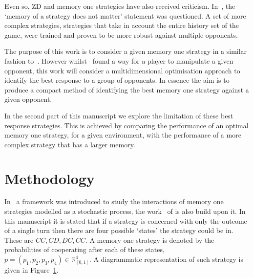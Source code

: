 \documentclass[10pt]{article}
\newcommand{\R}{\mathbb{R}}
\begin{document}
Even so, ZD and memory one strategies have also received criticism. In~\cite{Harper2015},
the `memory of a strategy does not matter' statement was questioned. A set of more
complex strategies, strategies that take in account the entire history set of the
game, were trained and proven to be more robust against multiple opponents.

The purpose of this work is to consider a given memory one strategy 
in a similar fashion to~\cite{Press2012}. However whilst~\cite{Press2012} found
a way for a player to manipulate a given opponent, this work will consider a multidimensional
optimisation approach to identify the best response to a group of opponents. In
essence the aim is to produce a compact method of identifying the best memory one
strategy against a given opponent.

In the second part of this manuscript we explore the limitation of these best response
strategies. This is achieved by comparing the performance of an optimal
memory one strategy, for a given environment, with the performance of a more complex
strategy that has a larger memory.

\section{Methodology}

In~\cite{Nowak1989} a framework was introduced to study the interactions of memory
one strategies modelled as a stochastic process, the work~\cite{Press2012} of is
also build upon it. In this manuscript it is stated that if a strategy
is concerned with only the outcome of a single turn then there are four possible `states'
the strategy could be in. These are \(CC, CD, DC,CC\). A memory one strategy is denoted
by the probabilities of cooperating after each of these states,
\(p=(p_1, p_2, p_3, p_4) \in \R_{[0,1]} ^ 4\). A diagrammatic representation of
such strategy is given in Figure~\ref{fig:diagram_mem_one}.

\begin{figure}
    \centering
    \begin{subfigure}{0.45\textwidth}
        \centering
        
        \label{fig:diagram_mem_one}
    \end{subfigure}
    \begin{subfigure}{0.45\textwidth}
        \centering
        
        \label{fig:markov_chain}
    \end{subfigure}
\end{figure}
\end{document}
